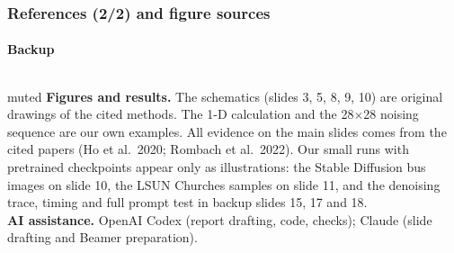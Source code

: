 \documentclass[aspectratio=169,9pt,xcolor=table]{beamer}
\begin{document}
\begin{frame}
\frametitle{References (2/2) and figure sources}
\framesubtitle{Backup}
\fontsize{7}{8.4}\selectfont
\begin{columns}[T,onlytextwidth]
\end{columns}
\vspace{2mm}
\begin{nbox}[fontupper=\fontsize{7}{8.4}\selectfont]{muted}
\textbf{Figures and results.} The schematics (slides 3, 5, 8, 9, 10) are original drawings of the cited methods. The 1-D calculation and the 28$\times$28 noising sequence are our own examples. All evidence on the main slides comes from the cited papers (Ho et al.\ 2020; Rombach et al.\ 2022). Our small runs with pretrained checkpoints appear only as illustrations: the Stable Diffusion bus images on slide 10, the LSUN Churches samples on slide 11, and the denoising trace, timing and full prompt test in backup slides 15, 17 and 18.\\[1mm]
\textbf{AI assistance.} OpenAI Codex (report drafting, code, checks); Claude (slide drafting and Beamer preparation).
\end{nbox}
\end{frame}
\end{document}
